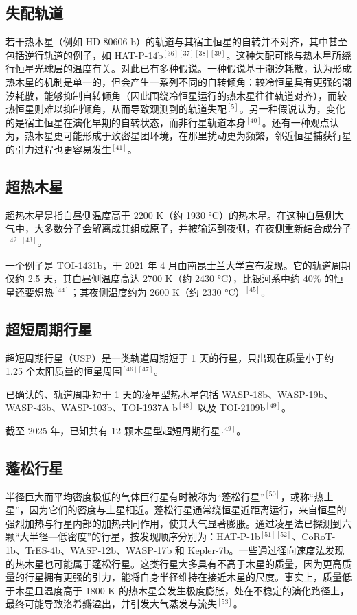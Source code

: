 \subsection{失配轨道}
若干热木星（例如 HD 80606 b）的轨道与其宿主恒星的自转并不对齐，其中甚至包括逆行轨道的例子，如 HAT-P-14b$^{[36][37][38][39]}$。这种失配可能与热木星所绕行恒星光球层的温度有关。对此已有多种假说。一种假说基于潮汐耗散，认为形成热木星的机制是单一的，但会产生一系列不同的自转倾角：较冷恒星具有更强的潮汐耗散，能够抑制自转倾角（因此围绕冷恒星运行的热木星往往轨道对齐），而较热恒星则难以抑制倾角，从而导致观测到的轨道失配$^{[5]}$。另一种假说认为，变化的是宿主恒星在演化早期的自转状态，而非行星轨道本身$^{[40]}$。还有一种观点认为，热木星更可能形成于致密星团环境，在那里扰动更为频繁，邻近恒星捕获行星的引力过程也更容易发生$^{[41]}$。
\subsection{超热木星}
超热木星是指白昼侧温度高于 2200 K（约 1930 °C）的热木星。在这种白昼侧大气中，大多数分子会解离成其组成原子，并被输运到夜侧，在夜侧重新结合成分子$^{[42][43]}$。

一个例子是 TOI-1431b，于 2021 年 4 月由南昆士兰大学宣布发现。它的轨道周期仅约 2.5 天，其白昼侧温度高达 2700 K（约 2430 °C），比银河系中约 40\% 的恒星还要炽热$^{[44]}$；其夜侧温度约为 2600 K（约 2330 °C）$^{[45]}$。
\subsection{超短周期行星}
超短周期行星（USP）是一类轨道周期短于 1 天的行星，只出现在质量小于约 1.25 个太阳质量的恒星周围$^{[46][47]}$。

已确认的、轨道周期短于 1 天的凌星型热木星包括 WASP-18b、WASP-19b、WASP-43b、WASP-103b、TOI-1937A b$^{[48]}$ 以及 TOI-2109b$^{[49]}$。

截至 2025 年，已知共有 12 颗木星型超短周期行星$^{[49]}$。
\subsection{蓬松行星}
半径巨大而平均密度极低的气体巨行星有时被称为“蓬松行星”$^{[50]}$，或称“热土星”，因为它们的密度与土星相近。蓬松行星通常绕恒星近距离运行，来自恒星的强烈加热与行星内部的加热共同作用，使其大气显著膨胀。通过凌星法已探测到六颗“大半径—低密度”的行星，按发现顺序分别为：HAT-P-1b$^{[51][52]}$、CoRoT-1b、TrES-4b、WASP-12b、WASP-17b 和 Kepler-7b。一些通过径向速度法发现的热木星也可能属于蓬松行星。这类行星大多具有不高于木星的质量，因为更高质量的行星拥有更强的引力，能将自身半径维持在接近木星的尺度。事实上，质量低于木星且温度高于 1800 K 的热木星会发生极度膨胀，处在不稳定的演化路径上，最终可能导致洛希瓣溢出，并引发大气蒸发与流失$^{[53]}$。

